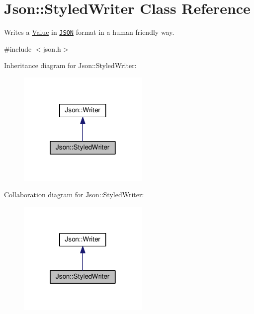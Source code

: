 \hypertarget{class_json_1_1_styled_writer}{}\section{Json\+:\+:Styled\+Writer Class Reference}
\label{class_json_1_1_styled_writer}


Writes a \hyperlink{class_json_1_1_value}{Value} in \href{http://www.json.org}{\tt J\+S\+ON} format in a human friendly way.  




{\ttfamily \#include $<$json.\+h$>$}



Inheritance diagram for Json\+:\+:Styled\+Writer\+:
\nopagebreak
\begin{figure}[H]
\begin{center}
\leavevmode
\includegraphics[width=178pt]{class_json_1_1_styled_writer__inherit__graph}
\end{center}
\end{figure}


Collaboration diagram for Json\+:\+:Styled\+Writer\+:
\nopagebreak
\begin{figure}[H]
\begin{center}
\leavevmode
\includegraphics[width=178pt]{class_json_1_1_styled_writer__coll__graph}
\end{center}
\end{figure}
